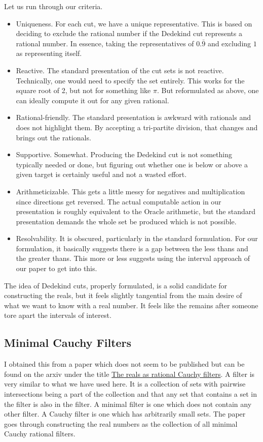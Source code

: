 \documentclass[12pt]{article}
\theoremstyle{remark}
\begin{document}
Let us run through our criteria. 

\begin{itemize}
    \item Uniqueness. For each cut, we have a unique representative. This is based on deciding to exclude the rational number if the Dedekind cut represents a rational number. In essence, taking the representatives of $0.\bar{9}$ and excluding $1$ as representing itself. 
    \item Reactive. The standard presentation of the cut sets is not reactive. Technically, one would need to specify the set entirely. This works for the square root of 2, but not for something like $\pi$. But reformulated as above, one can ideally compute it out for any given rational. 
    \item Rational-friendly. The standard presentation is awkward with rationals and does not highlight them. By accepting a tri-partite division, that changes and brings out the rationals. 
    \item Supportive. Somewhat. Producing the Dedekind cut is not something typically needed or done, but figuring out whether one is below or above a given target is certainly useful and not a wasted effort. 
    \item Arithmeticizable. This gets a little messy for negatives and multiplication since directions get reversed. The actual computable action in our presentation is roughly equivalent to the Oracle arithmetic, but the standard presentation demands the whole set be produced which is not possible.
    \item Resolvability. It is obscured, particularly in the standard formulation. For our formulation, it basically suggests there is a gap between the less thans and the greater thans. This more or less suggests using the interval approach of our paper to get into this. 
\end{itemize}

The idea of Dedekind cuts, properly formulated, is a solid candidate for constructing the reals, but it feels slightly tangential from the main desire of what we want to know with a real number. It feels like the remains after someone tore apart the intervals of interest. 

\subsection{Minimal Cauchy Filters}

I obtained this from a paper which does not seem to be published but can be found on the arxiv under the title \href{https://arxiv.org/abs/1503.04348v3}{The reals as rational Cauchy filters}. A filter is very similar to what we have used here. It is a collection of sets with pairwise intersections being a part of the collection and that any set that contains a set in the filter is also in the filter. A minimal filter is one which does not contain any other filter. A Cauchy filter is one which has arbitrarily small sets. The paper goes through constructing the real numbers as the collection of all minimal Cauchy rational filters. 
\end{document}

